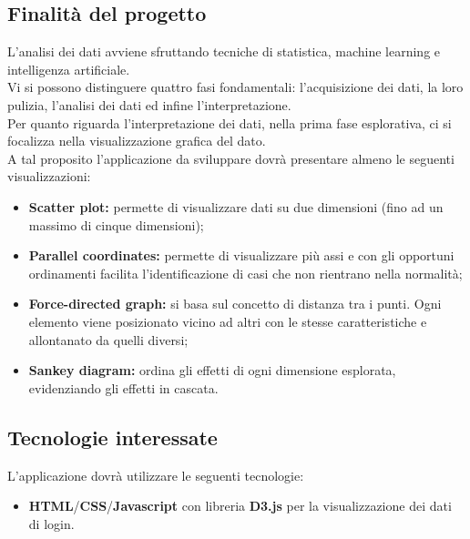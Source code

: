 \subsection{Finalità del progetto}
    L'analisi dei dati avviene sfruttando tecniche di statistica, machine learning\glo{} e intelligenza artificiale\glo{}.\\
    Vi si possono distinguere quattro fasi fondamentali: l'acquisizione dei dati, la loro pulizia, l'analisi dei dati ed infine l'interpretazione.\\
    Per quanto riguarda l'interpretazione dei dati, nella prima fase esplorativa, ci si focalizza nella visualizzazione grafica del dato.\\
    A tal proposito l'applicazione da sviluppare dovrà presentare almeno le seguenti visualizzazioni:
    \begin {itemize}
        \item \textbf{Scatter plot:} permette di visualizzare dati su due dimensioni (fino ad un massimo di cinque dimensioni);
        \item \textbf{Parallel coordinates:} permette di visualizzare più assi e con gli opportuni ordinamenti facilita l'identificazione di casi che non rientrano nella normalità;
        \item \textbf{Force-directed graph:} si basa sul concetto di distanza tra i punti. Ogni elemento viene posizionato vicino ad altri con le stesse caratteristiche e allontanato da quelli diversi;
        \item \textbf{Sankey diagram:} ordina gli effetti di ogni dimensione esplorata, evidenziando gli effetti in cascata.
    \end {itemize}

\subsection {Tecnologie interessate}
    L'applicazione dovrà utilizzare le seguenti tecnologie:
    \begin {itemize}
        \item \textbf{HTML\glo}/\textbf{CSS\glo}/\textbf{Javascript\glo} con libreria \textbf{D3.js\glo} per la visualizzazione dei dati di login.
    \end {itemize}

